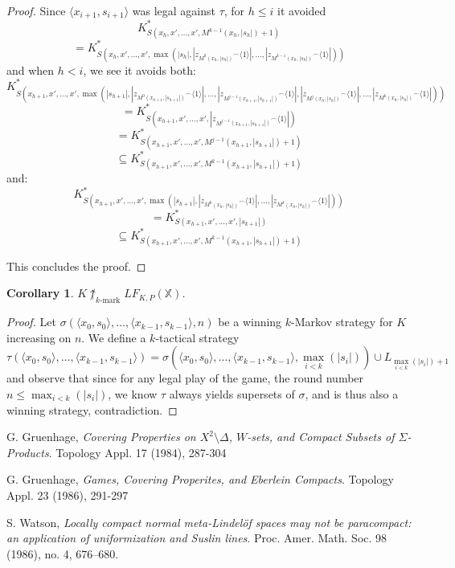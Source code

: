 \documentclass[11pt]{article}
\theoremstyle{plain}
\newtheorem{corollary}[theorem]{Corollary}
\theoremstyle{definition}
\theoremstyle{remark}
\newcommand{\kmarkwin}[1]{\uparrow_{#1\text{-mark}}}
\newcommand{\lfkpgame}[1]{LF_{K,P}(#1)}
\newcommand{\<}{\langle}
\renewcommand{\>}{\rangle}
\begin{document}
\begin{proof}
Since $\<x_{i+1},s_{i+1}\>$ was legal against $\tau$, for $h\leq i$ it avoided
  \[
    K^*_{S(x_h,x',\dots,x',M^{k-1}(x_h,|s_h|)+1)} 
  \]
  \[
    = 
    K^*_{S(x_h,x',\dots,x',\max(|s_h|,|{z_{M^{0}(x_h,|s_h|)}}^\frown\<1\>|,\dots,|{z_{M^{k-1}(x_h,|s_h|)}}^\frown\<1\>|))}
  \]
and when $h<i$, we see it avoids both:
  \[
    K^*_{S(x_{h+1},x',\dots,x',\max(|s_{h+1}|,|{z_{M^0(x_{h+1},|s_{h+1}|)}}^\frown\<1\>|,\dots,|{z_{M^{j-1}(x_{h+1},|s_{h+1}|)}}^\frown\<1\>|,|{z_{M^{j}(x_{h},|s_{h}|)}}^\frown\<1\>|,\dots,|{z_{M^{k}(x_{h},|s_{h}|)}}^\frown\<1\>|))} 
  \]
  \[
    =
    K^*_{S(x_{h+1},x',\dots,x',|{z_{M^{j-1}(x_{h+1},|s_{h+1}|)}}^\frown\<1\>|)}
  \]
  \[
    =
    K^*_{S(x_{h+1},x',\dots,x',M^{j-1}(x_{h+1},|s_{h+1}|)+1)}
  \]
  \[
    \subseteq
    K^*_{S(x_{h+1},x',\dots,x',M^{k-1}(x_{h+1},|s_{h+1}|)+1)}
  \]
and:
  \[
    K^*_{S(x_{h+1},x',\dots,x',\max(|s_{h+1}|,|{z_{M^0(x_{h},|s_{h}|)}}^\frown\<1\>|,\dots,|{z_{M^{k}(x_{h},|s_{h}|)}}^\frown\<1\>|))} 
  \]
  \[
    =
    K^*_{S(x_{h+1},x',\dots,x',|s_{k+1}|)}
  \]
  \[
    \subseteq
    K^*_{S(x_{h+1},x',\dots,x',M^{k-1}(x_{h+1},|s_{h+1}|)+1)}
  \]


This concludes the proof.
\end{proof}

\begin{corollary}
$K\not\kmarkwin{k}\lfkpgame{\mathbb{X}}$.
\end{corollary}

\begin{proof}
Let $\sigma(\<x_0,s_0\>,\dots,\<x_{k-1},s_{k-1}\>,n)$ be a winning $k$-Markov strategy for $K$ increasing on $n$. We define a $k$-tactical strategy
  \[
    \tau(\<x_0,s_0\>,\dots,\<x_{k-1},s_{k-1}\>) = \sigma(\<x_0,s_0\>,\dots,\<x_{k-1},s_{k-1}\>,\max_{i<k}(|s_i|)) \cup L_{\max_{i<k}(|s_i|)+1}
  \]
and observe that since for any legal play of the game, the round number $n \leq \max_{i<k}(|s_i|)$, we know $\tau$ always yields supersets of $\sigma$, and is thus also a winning strategy, contradiction.
\end{proof}

\begin{thebibliography}{9}

  G. Gruenhage,
  \emph{Covering Properties on $X^2\setminus\Delta$, $W$-sets, and Compact Subsets of $\Sigma$-Products}.
  Topology Appl. 17 (1984), 287-304

  G. Gruenhage,
  \emph{Games, Covering Properites, and Eberlein Compacts}.
  Topology Appl. 23 (1986), 291-297

  S. Watson,
  \emph{Locally compact normal meta-Lindel\"of spaces may not be paracompact: 
  an application of uniformization and Suslin lines}. 
  Proc. Amer. Math. Soc. 98 (1986), no. 4, 676–680.

\end{thebibliography}
\end{document}
